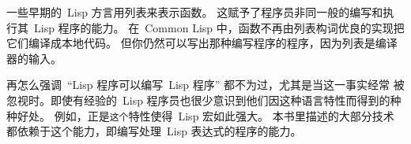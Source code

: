 一些早期的~Lisp 方言用列表来表示函数。
这赋予了程序员非同一般的编写和执行其~Lisp 程序的能力。
在~Common Lisp 中，函数不再由列表构词\pozhehao{}优良的实现把它们编译成本地代码。
但你仍然可以写出那种编写程序的程序，因为列表是编译器的输入。

再怎么强调~``Lisp 程序可以编写~Lisp 程序'' 都不为过，尤其是当这一事实经常
被忽视时。即使有经验的~Lisp
程序员也很少意识到他们因这种语言特性而得到的种种好处。
例如，正是\texttt{这个}特性使得~Lisp 宏如此强大。
本书里描述的大部分技术都依赖于这个能力，即编写处理~Lisp 表达式的程序的能力。

